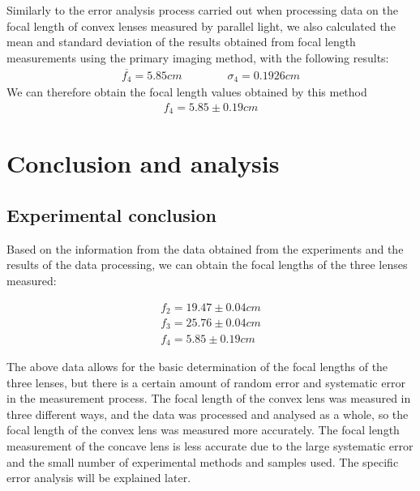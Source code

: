 \documentclass[UTF8]{article}
\begin{document}
            
        Similarly to the error analysis process carried out when processing data on the focal length of convex lenses measured by parallel light, we also calculated the mean and standard deviation of the results obtained from focal length measurements using the primary imaging method, with the following results:
        \begin{align*}
         \overline{f_4}  =  5.85cm \qquad \qquad \sigma _4  = 0.1926cm
        \end{align*}
        We can therefore obtain the focal length values obtained by this method
        \begin{align*}
        f_4 = 5.85\pm 0.19cm
        \end{align*}
    
    
    
\section{Conclusion and analysis}
\subsection{Experimental conclusion}

Based on the information from the data obtained from the experiments and the results of the data processing, we can obtain the focal lengths of the three lenses measured:

\begin{align*}
f_2 = 19.47\pm 0.04cm\\
f_3 = 25.76  \pm 0.04cm\\
f_4 = 5.85\pm 0.19cm
\end{align*}

The above data allows for the basic determination of the focal lengths of the three lenses, but there is a certain amount of random error and systematic error in the measurement process. The focal length of the convex lens was measured in three different ways, and the data was processed and analysed as a whole, so the focal length of the convex lens was measured more accurately. The focal length measurement of the concave lens is less accurate due to the large systematic error and the small number of experimental methods and samples used. The specific error analysis will be explained later.
\end{document}
